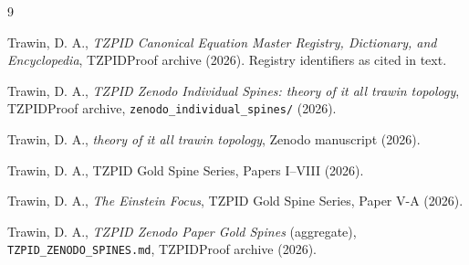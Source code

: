 \documentclass[11pt]{article}
\theoremstyle{remark}
\begin{document}
\begin{thebibliography}{9}

 Trawin, D. A., \emph{TZPID Canonical Equation Master Registry, Dictionary, and Encyclopedia}, TZPIDProof archive (2026). Registry identifiers as cited in text.

 Trawin, D. A., \emph{TZPID Zenodo Individual Spines: theory of it all trawin topology}, TZPIDProof archive, \texttt{zenodo\_individual\_spines/} (2026).

 Trawin, D. A., \emph{theory of it all trawin topology}, Zenodo manuscript (2026).

 Trawin, D. A., TZPID Gold Spine Series, Papers I--VIII (2026).

 Trawin, D. A., \emph{The Einstein Focus}, TZPID Gold Spine Series, Paper V-A (2026).

 Trawin, D. A., \emph{TZPID Zenodo Paper Gold Spines} (aggregate), \texttt{TZPID\_ZENODO\_SPINES.md}, TZPIDProof archive (2026).

\end{thebibliography}
\end{document}
